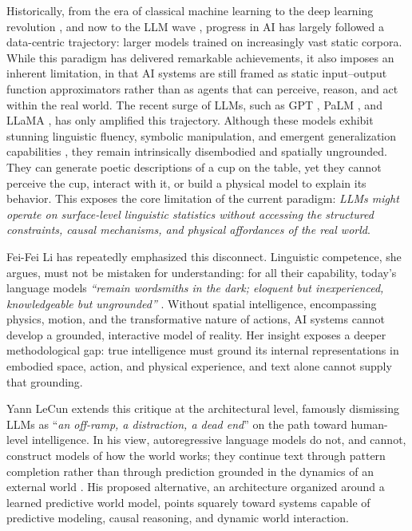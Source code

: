 Historically, from the era of classical machine learning \cite{CoughlanY99} to the deep learning revolution \cite{goodfellow2016deep}, and now to the LLM wave \cite{achiam2023gpt,vicuna2023}, progress in AI has largely followed a data-centric trajectory: larger models trained on increasingly vast static corpora.
While this paradigm has delivered remarkable achievements, it also imposes an inherent limitation, in that AI systems are still framed as static input--output function approximators rather than as agents that can perceive, reason, and act within the real world.
The recent surge of LLMs, such as GPT \cite{achiam2023gpt}, PaLM \cite{chowdhery2023palm}, and LLaMA \cite{touvron2023llama}, has only amplified this trajectory.
Although these models exhibit stunning linguistic fluency, symbolic manipulation, and emergent generalization capabilities \cite{yamada2023evaluating,zhang2025mllms}, they remain intrinsically disembodied and spatially ungrounded.
They can generate poetic descriptions of a cup on the table, yet they cannot perceive the cup, interact with it, or build a physical model to explain its behavior.
This exposes the core limitation of the current paradigm: \emph{LLMs might operate on surface-level linguistic statistics without accessing the structured constraints, causal mechanisms, and physical affordances of the real world}.


Fei-Fei Li has repeatedly emphasized this disconnect.
Linguistic competence, she argues, must not be mistaken for understanding: for all their capability, today's language models \emph{``remain wordsmiths in the dark; eloquent but inexperienced, knowledgeable but ungrounded''} \cite{Feifei2025spatial}.
Without spatial intelligence, encompassing physics, motion, and the transformative nature of actions, AI systems cannot develop a grounded, interactive model of reality.
Her insight exposes a deeper methodological gap: true intelligence must ground its internal representations in embodied space, action, and physical experience, and text alone cannot supply that grounding.



Yann LeCun extends this critique at the architectural level, famously dismissing LLMs as ``\emph{an off-ramp, a distraction, a dead end}'' on the path toward human-level intelligence.
In his view, autoregressive language models do not, and cannot, construct models of how the world works; they continue text through pattern completion rather than through prediction grounded in the dynamics of an external world \cite{lecun2022path}.
His proposed alternative, an architecture organized around a learned predictive world model, points squarely toward systems capable of predictive modeling, causal reasoning, and dynamic world interaction.



